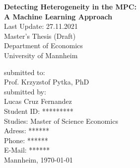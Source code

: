 \begin{titlepage}

\begin{center}

\vspace*{1,2cm}

\Large {\bfseries Detecting Heterogeneity in the MPC: \\ A Machine Learning Approach}\\[2cm]
\large {Last Update: 27.11.2021}\\[1cm]

\large {Master's Thesis (Draft)}\\[1cm]
\large {Department of Economics}\\[0.2cm]

\large {University of Mannheim}\\[0.5cm]

\end{center}

\vfill

\noindent submitted to:\\
Prof. Krzyzstof Pytka, PhD\\[0.5cm]
submitted by:\\
Lucas Cruz Fernandez\\[0.5cm]
Student ID: *********\\
Studies: Master of Science Economics \\[0.5cm]
Adress: ****** \\
Phone: ****** \\
E-Mail: ****** \\[0.5cm]
Mannheim, \today

\setcounter{page}{0}

\end{titlepage}
